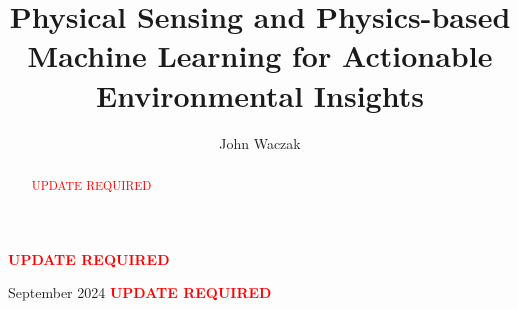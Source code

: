 \documentclass[doublespacing]{utdthesis}
\author{John Waczak}
\title{Physical Sensing and Physics-based Machine Learning for Actionable Environmental Insights}
\begin{document}
\frontmatter

\signaturepage


\begin{dedication} %
  \textbf{\textcolor{red}{UPDATE REQUIRED}}
\end{dedication}

\maketitle

\begin{acks}{September 2024}
  \textbf{\textcolor{red}{UPDATE REQUIRED}}
\end{acks}

\begin{abstract}

\textcolor{red}{UPDATE REQUIRED}

\end{abstract}
\end{document}
